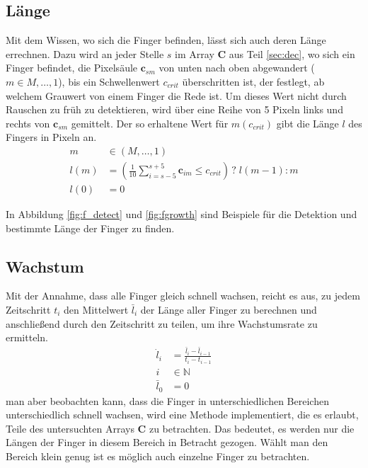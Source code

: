 \TODO{==========}
\subsection{Länge}
\label{sec:lan}
Mit dem Wissen, wo sich die Finger befinden, lässt sich auch deren Länge errechnen. Dazu wird an jeder Stelle $s$ im Array $\mathbf{C}$ aus Teil \ref{sec:dec}, 
wo sich ein Finger befindet, die Pixelsäule $\mathbf{c}_{sm}$ von unten nach oben abgewandert ($m \in M, \dots, 1$), bis ein Schwellenwert $c_{crit}$ 
überschritten ist, der festlegt, ab welchem Grauwert von einem Finger die Rede ist. Um dieses Wert nicht durch Rauschen zu früh zu detektieren, wird über eine 
Reihe von 5 Pixeln links und rechts von $\mathbf{c}_{sm}$ gemittelt. Der so erhaltene Wert für $m(c_{crit})$ gibt die Länge $l$ des Fingers in Pixeln an.
\begin{align}
 m &\in (M,\dots,1) \\
 l(m) &= \left(\frac{1}{10}\sum_{i=s-5}^{s+5} \mathbf{c}_{im} \leq c_{crit} \right) \, ? \; l(m-1) : m \\
 l(0) &= 0
\end{align}

In Abbildung \ref{fig:f_detect} und \ref{fig:fgrowth} sind Beispiele für die Detektion und bestimmte Länge der Finger zu finden.

\subsection{Wachstum}
\label{sec:grow}
Mit der Annahme, dass alle Finger gleich schnell wachsen, reicht es aus, zu jedem Zeitschritt $t_i$ den Mittelwert $\bar{l}_i$ der Länge aller Finger zu 
berechnen und anschließend durch den Zeitschritt zu teilen, um ihre Wachstumsrate zu ermitteln. 
\begin{align}
 \dot{l}_i &= \frac{\bar{l}_i-\bar{l}_{i-1}}{t_i-t_{i-1}} \\
 i &\in \mathbb{N} \\
 \bar{l}_{0} &= 0
\end{align}
man aber beobachten kann, dass die Finger in unterschiedlichen Bereichen unterschiedlich schnell wachsen, wird eine Methode implementiert, die es erlaubt, Teile 
des untersuchten Arrays $\mathbf{C}$ zu betrachten. Das bedeutet, es werden nur die Längen der Finger in diesem Bereich in Betracht gezogen. Wählt man den 
Bereich klein genug ist es möglich auch einzelne Finger zu betrachten.

